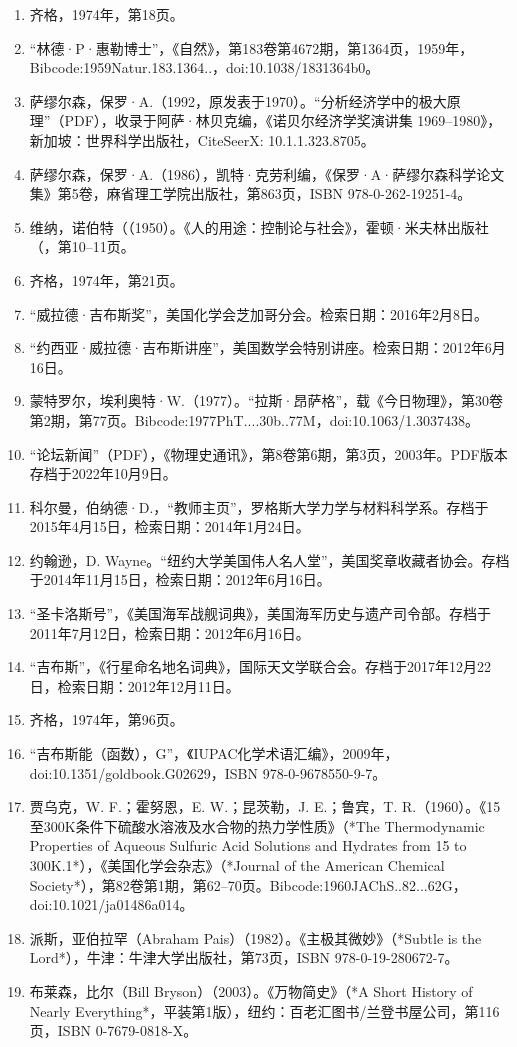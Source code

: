 \begin{enumerate}
\item 齐格，1974年，第18页。
\item “林德·P·惠勒博士”，《自然》，第183卷第4672期，第1364页，1959年，Bibcode:1959Natur.183.1364..，doi:10.1038/1831364b0。
\item 萨缪尔森，保罗·A.（1992，原发表于1970）。“分析经济学中的极大原理”（PDF），收录于阿萨·林贝克编，《诺贝尔经济学奖演讲集 1969–1980》，新加坡：世界科学出版社，CiteSeerX: 10.1.1.323.8705。
\item 萨缪尔森，保罗·A.（1986），凯特·克劳利编，《保罗·A·萨缪尔森科学论文集》第5卷，麻省理工学院出版社，第863页，ISBN 978-0-262-19251-4。
\item 维纳，诺伯特（（1950）。《人的用途：控制论与社会》，霍顿·米夫林出版社（，第10–11页。
\item 齐格，1974年，第21页。
\item “威拉德·吉布斯奖”，美国化学会芝加哥分会。检索日期：2016年2月8日。
\item “约西亚·威拉德·吉布斯讲座”，美国数学会特别讲座。检索日期：2012年6月16日。
\item 蒙特罗尔，埃利奥特·W.（1977）。“拉斯·昂萨格”，载《今日物理》，第30卷第2期，第77页。Bibcode:1977PhT....30b..77M，doi:10.1063/1.3037438。
\item “论坛新闻”（PDF），《物理史通讯》，第8卷第6期，第3页，2003年。PDF版本存档于2022年10月9日。
\item 科尔曼，伯纳德·D.，“教师主页”，罗格斯大学力学与材料科学系。存档于2015年4月15日，检索日期：2014年1月24日。
\item 约翰逊，D. Wayne。“纽约大学美国伟人名人堂”，美国奖章收藏者协会。存档于2014年11月15日，检索日期：2012年6月16日。
\item “圣卡洛斯号”，《美国海军战舰词典》，美国海军历史与遗产司令部。存档于2011年7月12日，检索日期：2012年6月16日。
\item “吉布斯”，《行星命名地名词典》，国际天文学联合会。存档于2017年12月22日，检索日期：2012年12月11日。
\item 齐格，1974年，第96页。
\item “吉布斯能（函数），G”，《IUPAC化学术语汇编》，2009年，doi:10.1351/goldbook.G02629，ISBN 978-0-9678550-9-7。
\item 贾乌克，W. F.；霍努恩，E. W.；昆茨勒，J. E.；鲁宾，T. R.（1960）。《15至300K条件下硫酸水溶液及水合物的热力学性质》（*The Thermodynamic Properties of Aqueous Sulfuric Acid Solutions and Hydrates from 15 to 300K.1*），《美国化学会杂志》（*Journal of the American Chemical Society*），第82卷第1期，第62–70页。Bibcode:1960JAChS..82...62G，doi:10.1021/ja01486a014。
\item 派斯，亚伯拉罕（Abraham Pais）（1982）。《主极其微妙》（*Subtle is the Lord*），牛津：牛津大学出版社，第73页，ISBN 978-0-19-280672-7。
\item 布莱森，比尔（Bill Bryson）（2003）。《万物简史》（*A Short History of Nearly Everything*，平装第1版），纽约：百老汇图书/兰登书屋公司，第116页，ISBN 0-7679-0818-X。


\end{enumerate}
